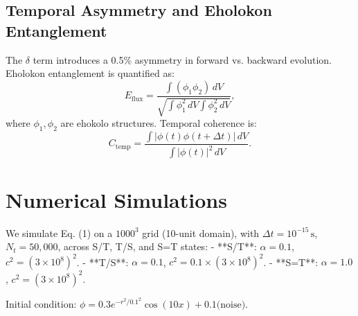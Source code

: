 \documentclass[11pt]{article}
\begin{document}
\subsection{Temporal Asymmetry and Eholokon Entanglement}
The \(\delta\) term introduces a 0.5\% asymmetry in forward vs. backward evolution. Eholokon entanglement is quantified as:
\begin{equation}
E_{\text{flux}} = \frac{\int (\phi_1 \phi_2) \, dV}{\sqrt{\int \phi_1^2 \, dV \int \phi_2^2 \, dV}},
\end{equation}
where \(\phi_1, \phi_2\) are ehokolo structures. Temporal coherence is:
\begin{equation}
C_{\text{temp}} = \frac{\int |\phi(t) \phi(t + \Delta t)| \, dV}{\int |\phi(t)|^2 \, dV}.
\end{equation}

\section{Numerical Simulations}
We simulate Eq. (1) on a $1000^3$ grid (10-unit domain), with \(\Delta t = 10^{-15} \, \text{s}\), \(N_t = 50,000\), across S/T, T/S, and S=T states:
- **S/T**: \(\alpha = 0.1\), \(c^2 = (3 \times 10^8)^2\).
- **T/S**: \(\alpha = 0.1\), \(c^2 = 0.1 \times (3 \times 10^8)^2\).
- **S=T**: \(\alpha = 1.0\), \(c^2 = (3 \times 10^8)^2\).

Initial condition: \(\phi = 0.3 e^{-r^2/0.1^2} \cos(10x) + 0.1 \text{(noise)}\).
\end{document}
